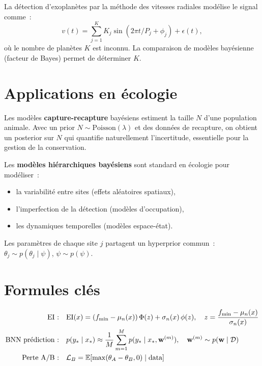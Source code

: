 \begin{exemple}
La d\'etection d'exoplan\`etes par la m\'ethode des vitesses radiales
mod\'elise le signal comme~:
\[
  v(t) = \sum_{j=1}^{K} K_j \sin(2\pi t / P_j + \phi_j) + \epsilon(t),
\]
o\`u le nombre de plan\`etes $K$ est inconnu. La comparaison de mod\`eles
bay\'esienne (facteur de Bayes) permet de d\'eterminer $K$.
\end{exemple}

\section{Applications en \'ecologie}

\begin{exemple}
Les mod\`eles \textbf{capture-recapture} bay\'esiens estiment la taille
$N$ d'une population animale. Avec un prior $N \sim \mathrm{Poisson}(\lambda)$
et des donn\'ees de recapture, on obtient un posterior sur $N$ qui quantifie
naturellement l'incertitude, essentielle pour la gestion de la conservation.
\end{exemple}

\begin{definition}
Les \textbf{mod\`eles hi\'erarchiques bay\'esiens} sont standard en \'ecologie
pour mod\'eliser~:
\begin{itemize}
  \item la variabilit\'e entre sites (effets al\'eatoires spatiaux),
  \item l'imperfection de la d\'etection (mod\`eles d'occupation),
  \item les dynamiques temporelles (mod\`eles espace-\'etat).
\end{itemize}
Les param\`etres de chaque site $j$ partagent un hyperprior commun~:
$\theta_j \sim p(\theta_j \mid \psi)$, $\psi \sim p(\psi)$.
\end{definition}

\section{Formules cl\'es}

\begin{formules}
\begin{align}
  \text{EI :} \quad & \mathrm{EI}(x) = (f_{\min} - \mu_n(x))\,\Phi(z) + \sigma_n(x)\,\phi(z),
    \quad z = \frac{f_{\min} - \mu_n(x)}{\sigma_n(x)} \\
  \text{BNN pr\'ediction :} \quad & p(y_* \mid x_*) \approx
    \frac{1}{M}\sum_{m=1}^M p(y_* \mid x_*, \mathbf{w}^{(m)}),
    \quad \mathbf{w}^{(m)} \sim p(\mathbf{w} \mid \mathcal{D}) \\
  \text{Perte A/B :} \quad & \mathcal{L}_B = \mathbb{E}[\max(\theta_A - \theta_B, 0) \mid \text{data}]
\end{align}
\end{formules}

